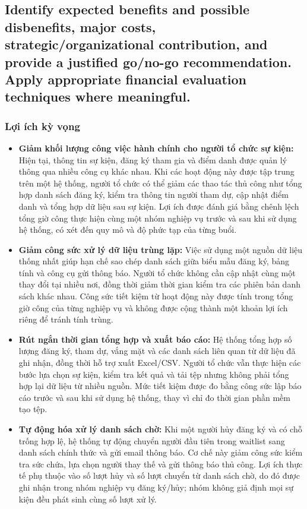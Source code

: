 \subsection{Identify expected benefits and possible disbenefits, major costs, strategic/organizational contribution, and provide a justified go/no-go recommendation. Apply appropriate financial evaluation techniques where meaningful.}

\subsubsection{Lợi ích kỳ vọng}


\begin{itemize}
    \item \textbf{Giảm khối lượng công việc hành chính cho người tổ chức sự kiện:} Hiện tại, thông tin sự kiện, đăng ký tham gia và điểm danh được quản lý thông qua nhiều công cụ khác nhau. Khi các hoạt động này được tập trung trên một hệ thống, người tổ chức có thể giảm các thao tác thủ công như tổng hợp danh sách đăng ký, kiểm tra thông tin người tham dự, cập nhật điểm danh và tổng hợp dữ liệu sau sự kiện. Lợi ích được đánh giá bằng chênh lệch tổng giờ công thực hiện cùng một nhóm nghiệp vụ trước và sau khi sử dụng hệ thống, có xét đến quy mô và độ phức tạp của từng buổi.

    \item \textbf{Giảm công sức xử lý dữ liệu trùng lặp:} Việc sử dụng một nguồn dữ liệu thống nhất giúp hạn chế sao chép danh sách giữa biểu mẫu đăng ký, bảng tính và công cụ gửi thông báo. Người tổ chức không cần cập nhật cùng một thay đổi tại nhiều nơi, đồng thời giảm thời gian kiểm tra các phiên bản danh sách khác nhau. Công sức tiết kiệm từ hoạt động này được tính trong tổng giờ công của từng nghiệp vụ và không được cộng thành một khoản lợi ích riêng để tránh tính trùng.

    \item \textbf{Rút ngắn thời gian tổng hợp và xuất báo cáo:} Hệ thống tổng hợp số lượng đăng ký, tham dự, vắng mặt và các danh sách liên quan từ dữ liệu đã ghi nhận, đồng thời hỗ trợ xuất Excel/CSV. Người tổ chức vẫn thực hiện các bước lựa chọn sự kiện, kiểm tra kết quả và tải tệp nhưng không phải tổng hợp lại dữ liệu từ nhiều nguồn. Mức tiết kiệm được đo bằng công sức lập báo cáo trước và sau khi sử dụng hệ thống, thay vì chỉ đo thời gian phần mềm tạo tệp.

    \item \textbf{Tự động hóa xử lý danh sách chờ:} Khi một người hủy đăng ký và có chỗ trống hợp lệ, hệ thống tự động chuyển người đầu tiên trong waitlist sang danh sách chính thức và gửi email thông báo. Cơ chế này giảm công sức kiểm tra sức chứa, lựa chọn người thay thế và gửi thông báo thủ công. Lợi ích thực tế phụ thuộc vào số lượt hủy và số lượt chuyển từ danh sách chờ, do đó được ghi nhận trong nhóm nghiệp vụ đăng ký/hủy; nhóm không giả định mọi sự kiện đều phát sinh cùng số lượt xử lý.
\end{itemize}

